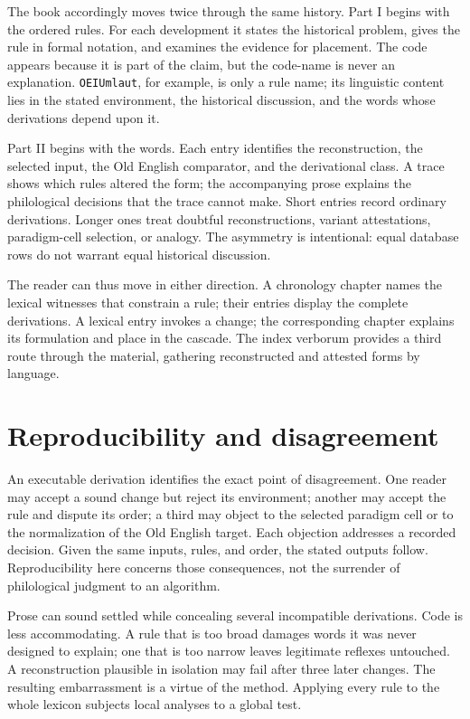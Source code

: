 \documentclass[
  british,
  a4paper,
  openany]{book}
\begin{document}
The book accordingly moves twice through the same history. Part I begins
with the ordered rules. For each development it states the historical
problem, gives the rule in formal notation, and examines the evidence
for placement. The code appears because it is part of the claim, but the
code-name is never an explanation. \texttt{OEIUmlaut}, for example, is
only a rule name; its linguistic content lies in the stated environment,
the historical discussion, and the words whose derivations depend upon
it.

Part II begins with the words. Each entry identifies the reconstruction,
the selected input, the Old English comparator, and the derivational
class. A trace shows which rules altered the form; the accompanying
prose explains the philological decisions that the trace cannot make.
Short entries record ordinary derivations. Longer ones treat doubtful
reconstructions, variant attestations, paradigm-cell selection, or
analogy. The asymmetry is intentional: equal database rows do not
warrant equal historical discussion.

The reader can thus move in either direction. A chronology chapter names
the lexical witnesses that constrain a rule; their entries display the
complete derivations. A lexical entry invokes a change; the
corresponding chapter explains its formulation and place in the cascade.
The index verborum provides a third route through the material,
gathering reconstructed and attested forms by language.

\section{Reproducibility and
disagreement}\label{reproducibility-and-disagreement}

An executable derivation identifies the exact point of disagreement. One
reader may accept a sound change but reject its environment; another may
accept the rule and dispute its order; a third may object to the
selected paradigm cell or to the normalization of the Old English
target. Each objection addresses a recorded decision. Given the same
inputs, rules, and order, the stated outputs follow. Reproducibility
here concerns those consequences, not the surrender of philological
judgment to an algorithm.

Prose can sound settled while concealing several incompatible
derivations. Code is less accommodating. A rule that is too broad
damages words it was never designed to explain; one that is too narrow
leaves legitimate reflexes untouched. A reconstruction plausible in
isolation may fail after three later changes. The resulting
embarrassment is a virtue of the method. Applying every rule to the
whole lexicon subjects local analyses to a global test.
\end{document}
